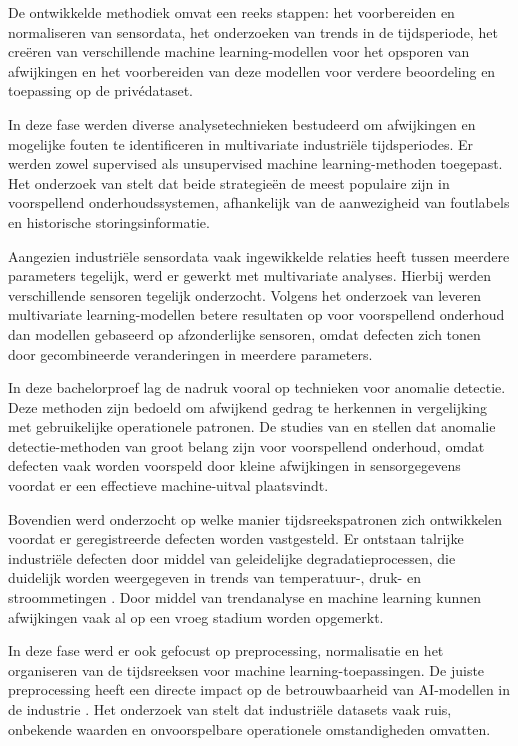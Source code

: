 De ontwikkelde methodiek omvat een reeks stappen: het voorbereiden en normaliseren van sensordata, het onderzoeken van trends in de tijdsperiode, het creëren van verschillende machine learning-modellen voor het opsporen van afwijkingen en het voorbereiden van deze modellen voor verdere beoordeling en toepassing op de privédataset.

In deze fase werden diverse analysetechnieken bestudeerd om afwijkingen en mogelijke fouten te identificeren in multivariate industriële tijdsperiodes. Er werden zowel supervised als unsupervised machine learning-methoden toegepast. Het onderzoek van \textcite{Carvalho2019} stelt dat beide strategieën de meest populaire zijn in voorspellend onderhoudssystemen, afhankelijk van de aanwezigheid van foutlabels en historische storingsinformatie.

Aangezien industriële sensordata vaak ingewikkelde relaties heeft tussen meerdere parameters tegelijk, werd er gewerkt met multivariate analyses. Hierbij werden verschillende sensoren tegelijk onderzocht. Volgens het onderzoek van \textcite{Li2025} leveren multivariate learning-modellen betere resultaten op voor voorspellend onderhoud dan modellen gebaseerd op afzonderlijke sensoren, omdat defecten zich tonen door gecombineerde veranderingen in meerdere parameters.

In deze bachelorproef lag de nadruk vooral op technieken voor anomalie detectie. Deze methoden zijn bedoeld om afwijkend gedrag te herkennen in vergelijking met gebruikelijke operationele patronen. De studies van \textcite{Giannoulidis2024} en \textcite{Davari2021} stellen dat anomalie detectie-methoden van groot belang zijn voor voorspellend onderhoud, omdat defecten vaak worden voorspeld door kleine afwijkingen in sensorgegevens voordat er een effectieve machine-uitval plaatsvindt.

Bovendien werd onderzocht op welke manier tijdsreekspatronen zich ontwikkelen voordat er geregistreerde defecten worden vastgesteld. Er ontstaan talrijke industriële defecten door middel van geleidelijke degradatieprocessen, die duidelijk worden weergegeven in trends van temperatuur-, druk- en stroommetingen \autocite{Xue2025}. Door middel van trendanalyse en machine learning kunnen afwijkingen vaak al op een vroeg stadium worden opgemerkt.

In deze fase werd er ook gefocust op preprocessing, normalisatie en het organiseren van de tijdsreeksen voor machine learning-toepassingen. De juiste preprocessing heeft een directe impact op de betrouwbaarheid van AI-modellen in de industrie \autocite{Elahi2023}. Het onderzoek van \textcite{Dissem2024} stelt dat industriële datasets vaak ruis, onbekende waarden en onvoorspelbare operationele omstandigheden omvatten.

